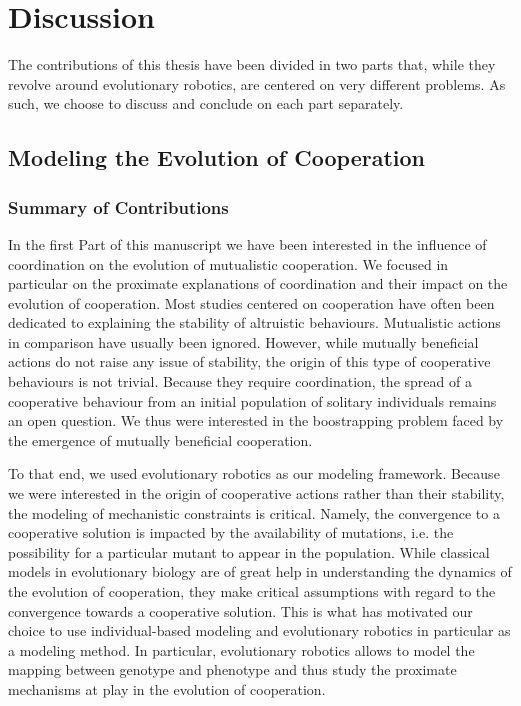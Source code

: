 \chapter{Discussion}


\setcounter{secnumdepth}{2}
\setcounter{minitocdepth}{2}
\minitoc[n] %

The contributions of this thesis have been divided in two parts that, while they revolve around evolutionary robotics, are centered on very different problems. As such, we choose to discuss and conclude on each part separately.

\section{Modeling the Evolution of Cooperation}

	\subsection{Summary of Contributions}

		In the first Part of this manuscript we have been interested in the influence of coordination on the evolution of mutualistic cooperation. We focused in particular on the proximate explanations of coordination and their impact on the evolution of cooperation. Most studies centered on cooperation have often been dedicated to explaining the stability of altruistic behaviours. Mutualistic actions in comparison have usually been ignored. However, while mutually beneficial actions do not raise any issue of stability, the origin of this type of cooperative behaviours is not trivial. Because they require coordination, the spread of a cooperative behaviour from an initial population of solitary individuals remains an open question. We thus were interested in the boostrapping problem faced by the emergence of mutually beneficial cooperation.

		To that end, we used evolutionary robotics as our modeling framework. Because we were interested in the origin of cooperative actions rather than their stability, the modeling of mechanistic constraints is critical. Namely, the convergence to a cooperative solution is impacted by the availability of mutations, i.e. the possibility for a particular mutant to appear in the population. While classical models in evolutionary biology are of great help in understanding the dynamics of the evolution of cooperation, they make critical assumptions with regard to the convergence towards a cooperative solution. This is what has motivated our choice to use individual-based modeling and evolutionary robotics in particular as a modeling method. In particular, evolutionary robotics allows to model the mapping between genotype and phenotype and thus study the proximate mechanisms at play in the evolution of cooperation.

